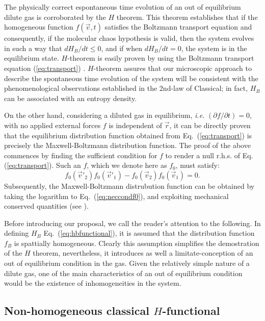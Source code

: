 The physically correct espontaneous time evolution of an out of equilibrium dilute gas 
is corroborated by the $H$ theorem.
This theorem establishes that if the homogeneous function $f(\vec{v},t)$ satisfies the Boltzmann
transport equation and consequently, if the molecular chaos hypothesis is valid, then
the system evolves in such a way that $dH_B/dt\leq0$, and if when $dH_B/dt=0$, 
the system is in the equilibrium state. $H$-theorem is easily proven by 
using the Boltzmann transport equation (\ref{eq:transport}) \cite{bib:huang}. 
$H$-theorem assures that our microscopic approach to describe the spontaneous 
time evolution of the system will be consistent with the phenomenological observations
established in the 2nd-law of Classical; in fact,
$H_B$ can be associated with an entropy density.

On the other hand, considering a diluted gas in equilibrium, \textit{i.e.}
$(\partial f/\partial t)=0$,
with no applied external forces $f$ is independent of $\vec r$, 
it can be directly proven that the equilibrium distribution function obtained from
Eq.~(\ref{eq:transport}) is precisely the Maxwell-Boltzmann
distribution function. The proof of the above commences by finding the sufficient
condition for $f$ to render a null r.h.s. of Eq. (\ref{eq:transport}). Such an
$f$, which we denote here as $f_0$, must satisfy:
%
\begin{equation}\label{eq:neccondf0}
    f_0(\vec{v}'_2)f_0(\vec{v}'_1)- f_0(\vec{v}_2)f_0(\vec{v}_1)=0.
\end{equation}
%
Subsequently, the Maxwell-Boltzmann distrubution function can be obtained by
taking the logarithm to Eq.~(\ref{eq:neccondf0}), and exploiting mechanical
conserved quantities (see \cite[ch. 4.2]{bib:huang}).

Before introducing our proposal, we call the reader's attention to the following. In defining
$H_B$ Eq.~(\ref{eq:hbfunctional}), it is assumed that the distribution function 
$f_B$ is spattially homogeneous. Clearly this assumption simplifies the demostration 
of the $H$ theorem, nevertheless, it introduces as well a limitate-conception
of an out of equilibrium condition in the gas. Given the relatively simple nature of a dilute 
gas, one of the main characteristics of an out of equilibrium condition would be the existence of
inhomogeneities in the system.

\subsection{Non-homogeneous classical $H$-functional}

